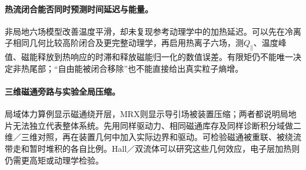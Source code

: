 \paragraph{热流闭合能否同时预测时间延迟与能量。}非局地六场模型改善温度平滑，却未复现参考动理学中的加热延迟。可以先在冷离子相同几何比较高阶闭合及更完整动理学，再启用热离子六场，测$Q_\parallel$、温度峰值、磁能释放到热响应的时滞和释放磁能归一化的数值误差。有限矩仍不能唯一决定非热尾部；“自由能被闭合移除”也不能直接给出真实粒子熵增。\citep{L244}

\paragraph{三维磁通旁路与实验全局压缩。}局域体力算例显示磁通绕开层，MRX则显示导引场被装置压缩；两者都说明局地片无法独立代表整体系统。先用同样驱动力、相同磁通库存及同样诊断积分域做二维／三维对照，再在装置几何中加入实际边界和驱动。可检验磁通被重联、被绕流带走和暂时堆积的各自比例。Hall／双流体可以研究这些几何效应，电子层加热则仍需更高矩或动理学检验。\citep{L076,F717,L193}
